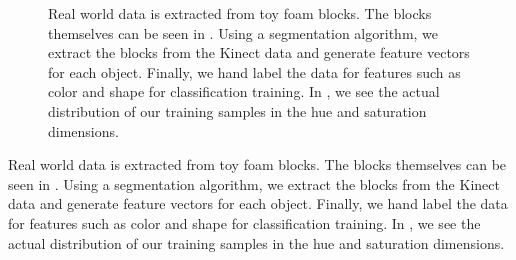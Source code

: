 \documentclass[11pt]{article}
\begin{document}
{\begin{figure}[h!]
\centering
{}
\caption{Real world data is extracted from toy foam blocks. The blocks
    themselves can be seen in . Using a segmentation
    algorithm, we extract the blocks from the Kinect data 
    and generate feature vectors for each object.
    Finally, we hand label the data for features such as color and shape for
    classification training. In , we see the actual
    distribution of our training samples in the hue and saturation
    dimensions.}
\label{fig:objects}
\end{figure}


Real world data is extracted from toy foam blocks. The blocks
    themselves can be seen in . Using a segmentation
    algorithm, we extract the blocks from the Kinect data 
    and generate feature vectors for each object.
    Finally, we hand label the data for features such as color and shape for
    classification training. In , we see the actual
    distribution of our training samples in the hue and saturation
    dimensions.


}
\end{document}
